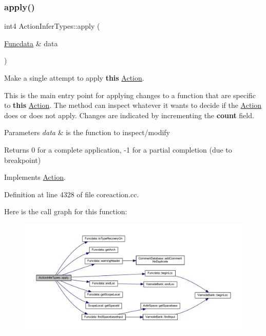 \subsubsection{\texorpdfstring{apply()}{apply()}}
{\footnotesize\ttfamily int4 Action\+Infer\+Types\+::apply (\begin{DoxyParamCaption}\item[{\mbox{\hyperlink{class_funcdata}{Funcdata}} \&}]{data }\end{DoxyParamCaption})\hspace{0.3cm}{\ttfamily [virtual]}}



Make a single attempt to apply {\bfseries{this}} \mbox{\hyperlink{class_action}{Action}}. 

This is the main entry point for applying changes to a function that are specific to {\bfseries{this}} \mbox{\hyperlink{class_action}{Action}}. The method can inspect whatever it wants to decide if the \mbox{\hyperlink{class_action}{Action}} does or does not apply. Changes are indicated by incrementing the {\bfseries{count}} field. 
\begin{DoxyParams}{Parameters}
{\em data} & is the function to inspect/modify \\
\hline
\end{DoxyParams}
\begin{DoxyReturn}{Returns}
0 for a complete application, -\/1 for a partial completion (due to breakpoint) 
\end{DoxyReturn}


Implements \mbox{\hyperlink{class_action_aac1c3999d6c685b15f5d9765a4d04173}{Action}}.



Definition at line 4328 of file coreaction.\+cc.

Here is the call graph for this function\+:
\nopagebreak
\begin{figure}[H]
\begin{center}
\leavevmode
\includegraphics[width=350pt]{class_action_infer_types_a0f50c538353ecf22ba3651d8e1a661ed_cgraph}
\end{center}
\end{figure}
\mbox{\label{class_action_infer_types_ac986d89b2fed20d29ded26939f5a90b8}} 
